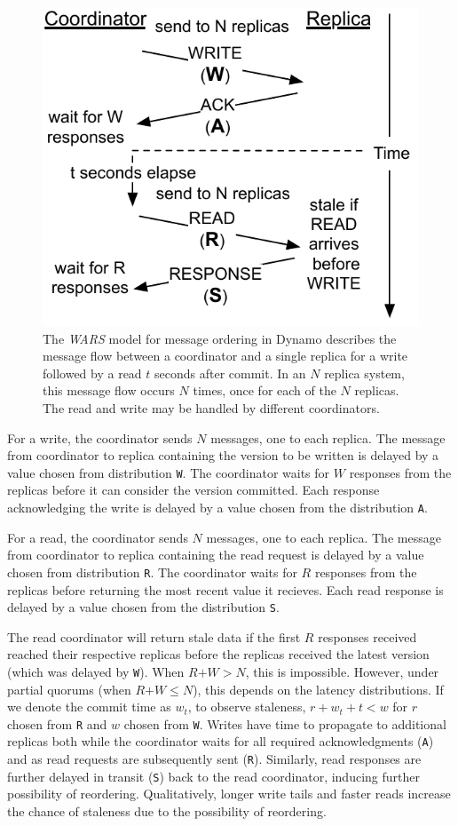 \documentclass{vldb}
\begin{document}
\begin{figure}
\centering
\includegraphics[width=.7\columnwidth]{figs/dynamostale.pdf}
\vspace{-8pt}
\caption{The \textit{WARS} model for message ordering in Dynamo
  describes the message flow between a coordinator and a single
  replica for a write followed by a read $t$ seconds after commit.  In
  an $N$ replica system, this message flow occurs $N$ times, once for
  each of the $N$ replicas.  The read and write may be handled by
  different coordinators.}
\vspace{-12pt}
\label{fig:dynamo-diagram}
\end{figure}

For a write, the coordinator sends $N$ messages, one to each
replica. The message from coordinator to replica containing the
version to be written is delayed by a value chosen from distribution
\texttt{W}.  The coordinator waits for $W$ responses from the replicas
before it can consider the version committed.  Each response
acknowledging the write is delayed by a value chosen from the
distribution \texttt{A}.

For a read, the coordinator sends $N$ messages, one to each replica.
The message from coordinator to replica containing the read request is
delayed by a value chosen from distribution \texttt{R}.  The
coordinator waits for $R$ responses from the replicas before returning
the most recent value it recieves.  Each read response is delayed by a
value chosen from the distribution \texttt{S}.

The read coordinator will return stale data if the first $R$ responses
received reached their respective replicas before the replicas
received the latest version (which was delayed by \texttt{W}).  When
$R$$+$$W$$>$$N$, this is impossible.  However, under partial quorums
(when $R$$+$$W$$\leq$$N$), this depends on the latency distributions.
If we denote the commit time as $w_t$, to observe staleness, $r+w_t+t<
w$ for $r$ chosen from \texttt{R} and $w$ chosen from \texttt{W}.
Writes have time to propagate to additional replicas both while the
coordinator waits for all required acknowledgments (\texttt{A}) and as
read requests are subsequently sent (\texttt{R}).  Similarly, read
responses are further delayed in transit (\texttt{S}) back to the read
coordinator, inducing further possibility of reordering.
Qualitatively, longer write tails and faster reads increase the chance
of staleness due to the possibility of reordering.
\end{document}
